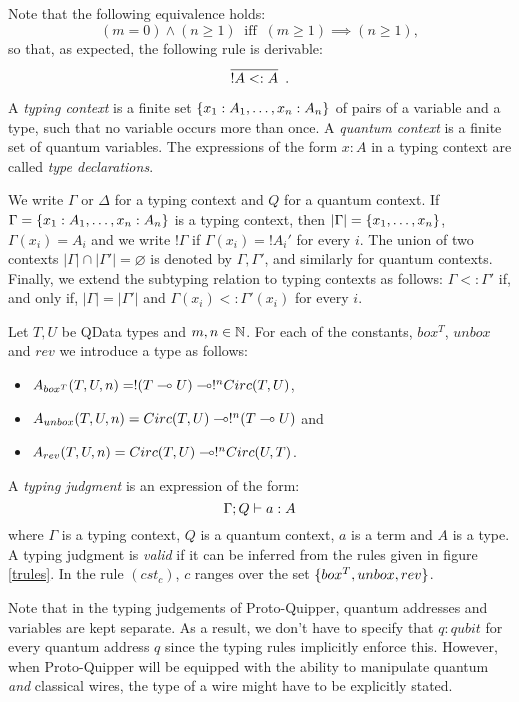 \documentclass{article}
\begin{document}
Note that the following equivalence holds: 
\[
(m=0)\wedge (n\geq 1) 
~\mbox{ iff }~ 
(m\geq 1) \implies (n\geq 1),
\]
so that, as expected, the following rule is derivable:
\[
  \infer[]{!A <: A}{}
  .
\]

\begin{definition}
A \emph{typing context} is a finite set 
$\{x_1:A_1,\ldots,x_n:A_n\}$ of pairs of a variable and 
a type, such that no variable occurs more than once. A 
\emph{quantum context} is a finite set of quantum variables. 
The expressions of the form $x:A$ in a typing context are 
called \emph{type declarations}.	
\end{definition}

We write $\Gamma$ or $\Delta$ for a typing context and $Q$ for 
a quantum context. If $\Gamma =\{x_1:A_1,\ldots,x_n:A_n\}$ is 
a typing context, then $|\Gamma|=\{x_1,\ldots,x_n\}$, 
$\Gamma (x_i)=A_i$ and we write $!\Gamma$ if $\Gamma(x_i)=!A_i'$ 
for every $i$. The union of two contexts 
$|\Gamma|\cap  |\Gamma'|=\varnothing$ is denoted by $\Gamma,\Gamma'$, 
and similarly for quantum contexts. Finally, we extend the subtyping 
relation to typing contexts as follows: $\Gamma <: \Gamma'$ if, and 
only if, $|\Gamma | = |\Gamma'|$ and $\Gamma (x_i)<: \Gamma' (x_i)$ 
for every $i$.

\begin{definition}
Let $T,U$ be QData types and $m,n\in\mathbb{N}$. For each of the constants, 
$box^T$, $unbox$ and $rev$ we introduce a type as follows:
\begin{itemize}
  \item $A_{box^T}(T,U,n)=!(T\multimap U)\multimap !^nCirc(T,U)$,
  \item $A_{unbox}(T,U,n)=Circ(T,U)\multimap !^n(T\multimap U)$ and
  \item $A_{rev}(T,U,n)=Circ(T,U) \multimap !^nCirc(U,T)$.
\end{itemize}
\end{definition}

\begin{definition}
A \emph{typing judgment} is an expression of the form:
\[
\Gamma ; Q \vdash a:A
\] 
where $\Gamma$ is a typing context, $Q$ is a quantum context, 
$a$ is a term and $A$ is a type. A typing judgment is \emph{valid} if 
it can be inferred from the rules given in figure 
\hyperref[trules]{\ref*{trules}}. In the rule $(cst_c)$, 
$c$ ranges over the set $\{box^T, unbox, rev\}$.
\end{definition}

Note that in the typing judgements of Proto-Quipper, quantum addresses 
and variables are kept separate. As a result, we don't have to specify 
that $q:qubit$ for every quantum address $q$ since the typing rules 
implicitly enforce this. However, when Proto-Quipper will be equipped 
with the ability to manipulate quantum \emph{and} classical wires, the 
type of a wire might have to be explicitly stated.
\end{document}
